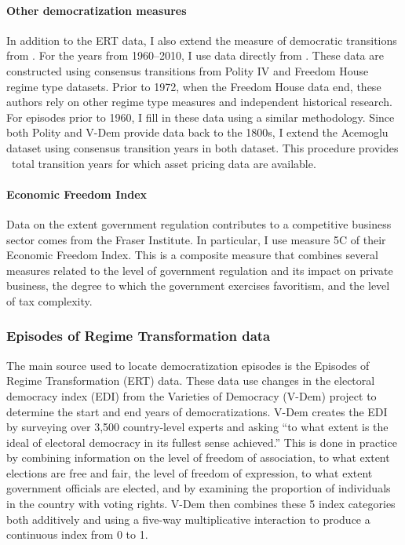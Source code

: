 \paragraph{Other democratization measures}
In addition to the ERT data, I also extend the measure of democratic transitions from \cite{Acemoglu2019}. For the years from 1960--2010, I use data directly from \citeauthor{Acemoglu2019}. These data are constructed using consensus transitions from Polity IV and Freedom House regime type datasets. Prior to 1972, when the Freedom House data end, these authors rely on other regime type measures and independent historical research. For episodes prior to 1960, I fill in these data using a similar methodology.   Since both Polity and V-Dem provide data back to the 1800s, I extend the Acemoglu dataset using consensus transition years in both dataset. This procedure provides \tabBThreeAceDem\ total transition years for which asset pricing data are available. 

\paragraph{Economic Freedom Index}
Data on the extent government regulation contributes to a competitive business sector comes from the Fraser Institute. In particular, I use measure 5C of their Economic Freedom Index. This is a composite measure that combines several measures related to the level of government regulation and its impact on private business, the degree to which the government exercises favoritism, and the level of tax complexity.

\subsubsection{Episodes of Regime Transformation data}\label{section:ERTdescription}

The main source used to locate democratization episodes is the Episodes of Regime Transformation (ERT) data. These data use changes in the electoral democracy index (EDI) from the Varieties of Democracy (V-Dem) project to determine the start and end years of democratizations.  V-Dem creates the EDI by surveying over 3,500 country-level experts and asking  ``to what extent is the ideal of electoral democracy in its fullest sense achieved.'' This is done in practice by combining information on the level of freedom of association, to what extent elections are free and fair, the level of freedom of expression, to what extent government officials are elected, and by examining the proportion of individuals in the country with voting rights. V-Dem then combines these 5 index categories both additively and using a five-way multiplicative interaction to produce a continuous index from 0 to 1.

